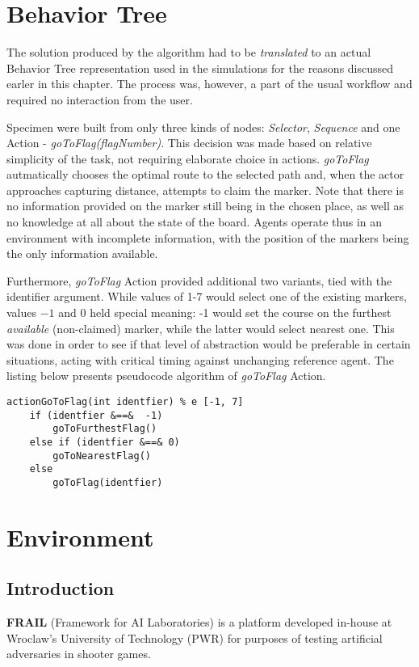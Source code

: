 \section{Behavior Tree}
The solution produced by the algorithm had to be \textit{translated} to an actual Behavior Tree representation used in the simulations for the reasons discussed earler in this chapter. The process was, however, a part of the usual workflow and required no interaction from the user.

Specimen were built from only three kinds of nodes: \textit{Selector}, \textit{Sequence} and one Action - \textit{goToFlag(flagNumber)}. This decision was made based on relative simplicity of the task, not requiring elaborate choice in actions. \textit{goToFlag} autmatically chooses the optimal route to the selected path and, when the actor approaches capturing distance, attempts to claim the marker. Note that there is no information provided on the marker still being in the chosen place, as well as no knowledge at all about the state of the board. Agents operate thus in an environment with incomplete information, with the position of the markers being the only information available.

Furthermore, \textit{goToFlag} Action provided additional two variants, tied with the identifier argument. While values of 1-7 would select one of the existing markers, values $-1$ and $0$ held special meaning: -1 would set the course on the furthest \textit{available} (non-claimed) marker, while the latter would select nearest one. This was done in order to see if that level of abstraction would be preferable in certain situations, acting with critical timing against unchanging reference agent. The listing below presents pseudocode algorithm of \textit{goToFlag} Action.

\begin{lstlisting}
actionGoToFlag(int identfier) % e [-1, 7]
    if (identfier &==&  -1)
        goToFurthestFlag()
    else if (identfier &==& 0)
        goToNearestFlag()
    else
        goToFlag(identfier)
\end{lstlisting}
\section{Environment}
\subsection{Introduction}
\textbf{FRAIL} (Framework for AI Laboratories) is a platform developed in-house at Wroclaw's University of Technology (PWR) for purposes of testing artificial adversaries in shooter games. \cite{frailweb}

